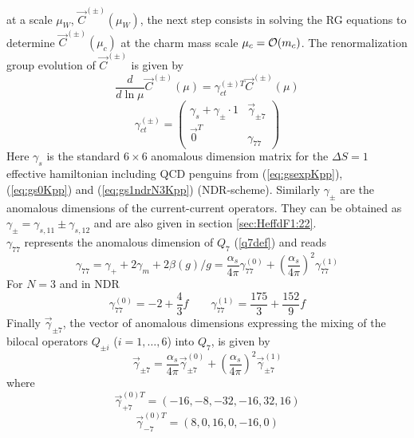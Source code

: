 at a scale $\mu_W$, $\vec C^{(\pm)}(\mu_W)$, the next step consists
in solving the RG equations to determine $\vec C^{(\pm)}(\mu_c)$
at the charm mass scale $\mu_c={\cal O}(m_c)$. The renormalization
group evolution of $\vec C^{(\pm)}$ is given by
\begin{equation}\label{rgct}
\frac{d}{d\ln\mu}\vec C^{(\pm)}(\mu)=\gamma^{(\pm)T}_{ct}
  \vec C^{(\pm)}(\mu)
\end{equation}
\begin{equation}\label{gpmct}
\gamma^{(\pm)}_{ct}=
\left( \begin{array}{cc}
\gamma_s+\gamma_\pm\cdot 1 & \vec\gamma_{\pm 7}\\
\vec 0^T  & \gamma_{77}  \end{array}  \right)
\end{equation}
Here $\gamma_s$ is the standard $6\times 6$ anomalous dimension matrix
for the $\Delta S=1$ effective hamiltonian including QCD penguins
from (\ref{eq:gsexpKpp}), (\ref{eq:gs0Kpp}) and (\ref{eq:gs1ndrN3Kpp})
(NDR-scheme). Similarly $\gamma_\pm$ are the anomalous dimensions of the
current-current operators. They can be obtained as
$\gamma_\pm=\gamma_{s,11}\pm\gamma_{s,12}$ and are also given in
section \ref{sec:HeffdF1:22}.
\\
$\gamma_{77}$ represents the anomalous dimension of $Q_7$ (\ref{q7def})
and reads
\begin{equation}\label{g77}
\gamma_{77}=\gamma_++2\gamma_m+2\beta(g)/g=
\frac{\alpha_s}{4\pi}\gamma^{(0)}_{77}+
\left(\frac{\alpha_s}{4\pi}\right)^2\gamma^{(1)}_{77}
\end{equation}
For $N=3$ and in NDR
\begin{equation}\label{g7701}
\gamma^{(0)}_{77}=-2+\frac{4}{3}f\qquad
\gamma^{(1)}_{77}=\frac{175}{3}+\frac{152}{9}f
\end{equation}
Finally $\vec\gamma_{\pm 7}$, the vector of anomalous dimensions expressing
the mixing of the bilocal operators $Q_{\pm i}$ ($i=1,\ldots,6$)
into $Q_7$, is given by
\begin{equation}\label{gpm7}
\vec\gamma_{\pm 7}=
\frac{\alpha_s}{4\pi}\vec\gamma^{(0)}_{\pm 7}+
\left(\frac{\alpha_s}{4\pi}\right)^2\vec\gamma^{(1)}_{\pm 7}
\end{equation}
where
\begin{equation}\label{gp70}
\vec\gamma^{(0)T}_{+7}=
\left(-16,-8,-32,-16,32,16\right)
\end{equation}
\begin{equation}\label{gm70}
\vec\gamma^{(0)T}_{-7}=
\left(8,0,16,0,-16,0\right)
\end{equation}
